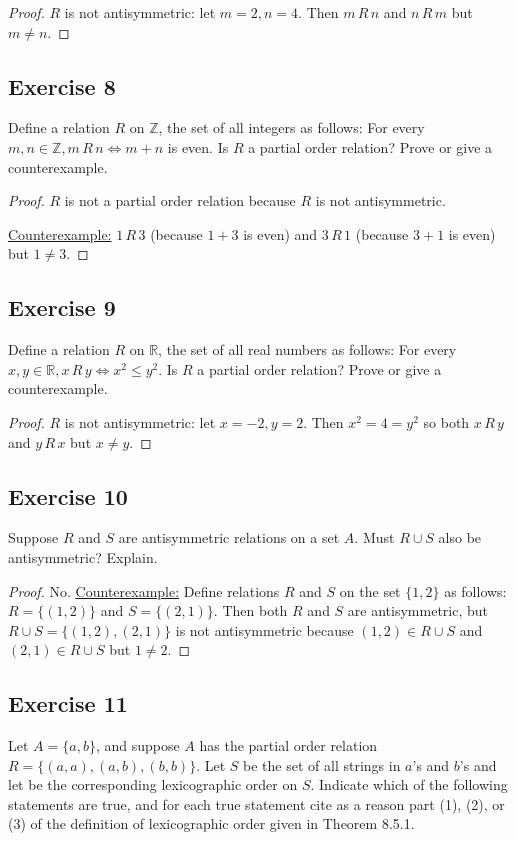 \documentclass[14pt]{extarticle}
\newcommand{\R}{\mathbb{R}}
\newcommand{\Z}{\mathbb{Z}}
\begin{document}
\begin{proof}
$R$ is not antisymmetric: let \(m = 2, n = 4\). Then \(m \,R\, n\) and \(n \,R\, m\) but \(m \neq n\).
\end{proof}

\subsection{Exercise 8}
Define a relation $R$ on $\Z$, the set of all integers as follows: For every \(m, n \in \Z, m \,R\, n \iff m + n\) 
is even. Is $R$ a partial order relation? Prove or give a counterexample.

\begin{proof}
$R$ is not a partial order relation because $R$ is not antisymmetric.

\underline{Counterexample:} \(1 \,R\, 3\) (because \(1 + 3\) is even) and \(3 \,R\, 1\) (because \(3 + 1\) is even) 
but \(1 \neq 3\).
\end{proof}

\subsection{Exercise 9}
Define a relation $R$ on $\R$, the set of all real numbers as follows: For every \(x,y\in\R,x\,R\,y\iff x^2\leq y^2\). 
Is $R$ a partial order relation? Prove or give a counterexample.

\begin{proof}
$R$ is not antisymmetric: let \(x = -2, y = 2\). Then \(x^2 = 4 = y^2\) so both \(x \,R\, y\) and \(y \,R\, x\) but
\(x \neq y\).
\end{proof}

\subsection{Exercise 10}
Suppose $R$ and $S$ are antisymmetric relations on a set $A$. Must \(R \cup S\) also be antisymmetric? Explain.

\begin{proof}
No. \underline{Counterexample:} Define relations $R$ and $S$ on the set \(\{1, 2\}\) as follows: \(R = \{(1, 2)\}\) 
and \(S = \{(2, 1)\}\). Then both $R$ and $S$ are antisymmetric, but \(R \cup S = \{(1, 2), (2, 1)\}\) is not antisymmetric because \((1, 2) \in R \cup S\) and \((2, 1) 
\in R \cup S\) but \(1 \neq 2\).
\end{proof}

\subsection{Exercise 11}
Let \(A = \{a, b\}\), and suppose \(A\) has the partial order relation \(R = \{(a, a),(a, b), (b, b)\}\). 
Let \(S\) be the set of all strings in \(a\)’s and \(b\)’s and let be the corresponding lexicographic order on \(S\). 
Indicate which of the following statements are true, and for each true statement cite as a reason part (1), (2), or 
(3) of the definition of lexicographic order given in Theorem 8.5.1.
\end{document}
